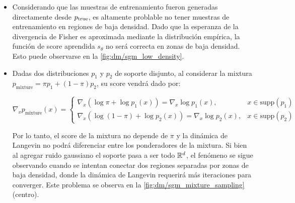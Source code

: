 \begin{itemize}
    \item Considerando que las muestras de entrenamiento fueron generadas directamente desde $p_{\operatorname{true}}$, es altamente problable no tener muestras de entrenamiento en regiones de baja densidad. Dado que la esperanza de la divergencia de Fisher es aproximada mediante la distribución empírica, la función de score aprendida $s_\theta$ no será correcta en zonas de baja densidad. Esto puede observarse en la \autoref{fig:dm/sgm_low_density}.


    \item Dadas dos distribuciones $p_1$ y $p_2$ de soporte disjunto, al considerar la mixtura $p_{\text{mixture}} = \pi p_1 + (1-\pi) p_2$, su score vendrá dado por:

          \begin{equation}
              \nabla_x p_{\text{mixture}}(x) = \begin{cases}
                  \nabla_x (\log \pi + \log p_1(x)) = \nabla_x\log p_1(x),     & x\in\text{supp}(p_1) \\
                  \nabla_x (\log (1-\pi) + \log p_2(x)) = \nabla_x\log p_2(x), & x\in\text{supp}(p_2)
              \end{cases}
          \end{equation}

          Por lo tanto, el score de la mixtura no depende de $\pi$ y la dinámica de Langevin no podrá diferenciar entre los ponderadores de la mixtura. Si bien al agregar ruido gaussiano el soporte pasa a ser todo $\mathbb{R}^d$, el fenómeno se sigue observando cuando se intentan conectar dos regiones separadas por zonas de baja densidad, donde la dinámica de Langevin requerirá más iteraciones para converger. Este problema se observa en la \autoref{fig:dm/sgm_mixture_sampling} (centro).

\end{itemize}


